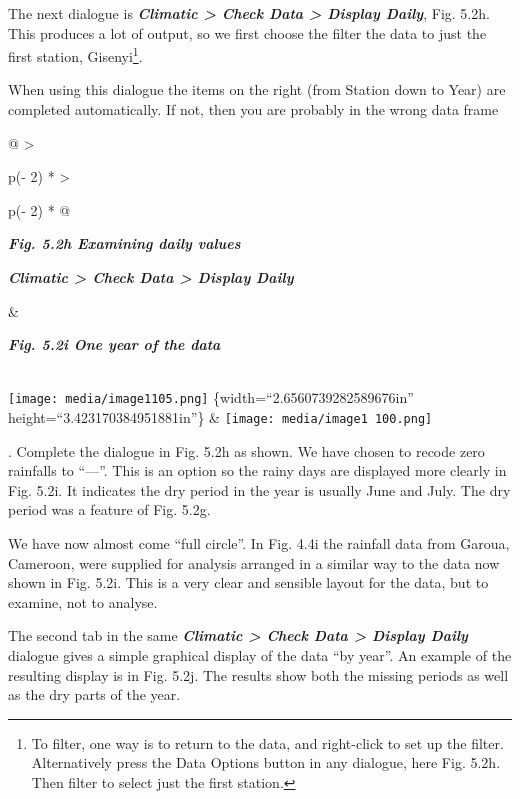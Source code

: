 \documentclass[
  letterpaper,
  DIV=11,
  numbers=noendperiod]{scrreprt}
\begin{document}
The next dialogue is \textbf{\emph{Climatic \textgreater{} Check Data
\textgreater{} Display Daily}}, Fig. 5.2h. This produces a lot of
output, so we first choose the filter the data to just the first
station, Gisenyi\footnote{To filter, one way is to return to the data,
  and right-click to set up the filter. Alternatively press the Data
  Options button in any dialogue, here Fig. 5.2h. Then filter to select
  just the first station.}.

When using this dialogue the items on the right (from Station down to
Year) are completed automatically. If not, then you are probably in the
wrong data frame

\begin{longtable}[]{@{}
  >{\raggedright\arraybackslash}p{(\columnwidth - 2\tabcolsep) * }
  >{\raggedright\arraybackslash}p{(\columnwidth - 2\tabcolsep) * }@{}}
\toprule\noalign{}
\begin{minipage}[b]{\linewidth}\raggedright
\textbf{\emph{Fig. 5.2h Examining daily values}}

\textbf{\emph{Climatic \textgreater{} Check Data \textgreater{} Display
Daily}}
\end{minipage} & \begin{minipage}[b]{\linewidth}\raggedright
\textbf{\emph{Fig. 5.2i One year of the data}}
\end{minipage} \\
\midrule\noalign{}
\endhead
\bottomrule\noalign{}
\endlastfoot
\texttt{[image: media/image1105.png]} \{width=``2.6560739282589676in''
height=``3.423170384951881in''\} &
\texttt{[image: media/image1 100.png]} \\
\end{longtable}

. Complete the dialogue in Fig. 5.2h as shown. We have chosen to recode
zero rainfalls to ``---''. This is an option so the rainy days are
displayed more clearly in Fig. 5.2i. It indicates the dry period in the
year is usually June and July. The dry period was a feature of Fig.
5.2g.

We have now almost come ``full circle''. In Fig. 4.4i the rainfall data
from Garoua, Cameroon, were supplied for analysis arranged in a similar
way to the data now shown in Fig. 5.2i. This is a very clear and
sensible layout for the data, but to examine, not to analyse.

The second tab in the same \textbf{\emph{Climatic \textgreater{} Check
Data \textgreater{} Display Daily}} dialogue gives a simple graphical
display of the data ``by year''. An example of the resulting display is
in Fig. 5.2j. The results show both the missing periods as well as the
dry parts of the year.
\end{document}
